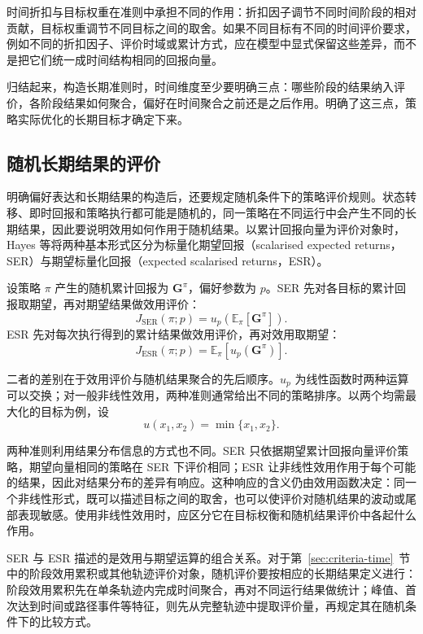 时间折扣与目标权重在准则中承担不同的作用：折扣因子调节不同时间阶段的相对贡献，目标权重调节不同目标之间的取舍。如果不同目标有不同的时间评价要求，例如不同的折扣因子、评价时域或累计方式，应在模型中显式保留这些差异，而不是把它们统一成时间结构相同的回报向量。

归结起来，构造长期准则时，时间维度至少要明确三点：哪些阶段的结果纳入评价，各阶段结果如何聚合，偏好在时间聚合之前还是之后作用。明确了这三点，策略实际优化的长期目标才确定下来。

\subsection{随机长期结果的评价}\label{sec:criteria-stochastic}

明确偏好表达和长期结果的构造后，还要规定随机条件下的策略评价规则。状态转移、即时回报和策略执行都可能是随机的，同一策略在不同运行中会产生不同的长期结果，因此要说明效用如何作用于随机结果。以累计回报向量为评价对象时，Hayes 等将两种基本形式区分为标量化期望回报（scalarised expected returns，SER）与期望标量化回报（expected scalarised returns，ESR）\cite{hayes2022}。

设策略 $\pi$ 产生的随机累计回报为 $\mathbf{G}^{\pi}$，偏好参数为 $p$。SER 先对各目标的累计回报取期望，再对期望结果做效用评价：
\begin{equation}
J_{\mathrm{SER}}(\pi;p)
=
u_p\!\left(
\mathbb{E}_{\pi}\!\left[\mathbf{G}^{\pi}\right]
\right).
\end{equation}
ESR 先对每次执行得到的累计结果做效用评价，再对效用取期望：
\begin{equation}
J_{\mathrm{ESR}}(\pi;p)
=
\mathbb{E}_{\pi}\!\left[
u_p\!\left(\mathbf{G}^{\pi}\right)
\right].
\end{equation}

二者的差别在于效用评价与随机结果聚合的先后顺序。$u_p$ 为线性函数时两种运算可以交换；对一般非线性效用，两种准则通常给出不同的策略排序。以两个均需最大化的目标为例，设
\begin{equation}
u(x_1,x_2)=\min\{x_1,x_2\}.
\end{equation}

两种准则利用结果分布信息的方式也不同。SER 只依据期望累计回报向量评价策略，期望向量相同的策略在 SER 下评价相同；ESR 让非线性效用作用于每个可能的结果，因此对结果分布的差异有响应。这种响应的含义仍由效用函数决定：同一个非线性形式，既可以描述目标之间的取舍，也可以使评价对随机结果的波动或尾部表现敏感。使用非线性效用时，应区分它在目标权衡和随机结果评价中各起什么作用。

SER 与 ESR 描述的是效用与期望运算的组合关系。对于第~\ref{sec:criteria-time}~节中的阶段效用累积或其他轨迹评价对象，随机评价要按相应的长期结果定义进行：阶段效用累积先在单条轨迹内完成时间聚合，再对不同运行结果做统计；峰值、首次达到时间或路径事件等特征，则先从完整轨迹中提取评价量，再规定其在随机条件下的比较方式。

